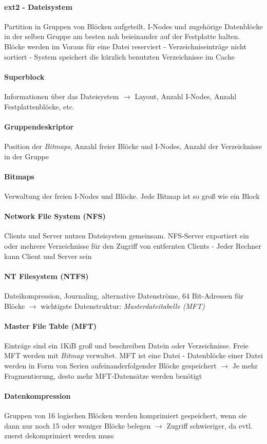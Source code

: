 \documentclass[11pt,a4paper,landscape]{article}
\begin{document}
\begin{multicols*}{3}
	\paragraph{ext2 - Dateisystem} Partition in Gruppen von Blöcken aufgeteilt. I-Nodes und zugehörige Datenblöcke in der selben Gruppe am besten nah beieinander auf der Festplatte halten. Blöcke werden im Voraus für eine Datei reserviert - Verzeichniseinträge nicht sortiert - System speichert die kürzlich benutzten Verzeichnisse im Cache
	\paragraph{Superblock} Informationen über das Dateisystem $\rightarrow$ Layout, Anzahl I-Nodes, Anzahl Festplattenblöcke, etc.
	\paragraph{Gruppendeskriptor} Position der \textit{Bitmaps}, Anzahl freier Blöcke und I-Nodes, Anzahl der Verzeichnisse in der Gruppe
	\paragraph{Bitmaps} Verwaltung der freien I-Nodes und Blöcke. Jede Bitmap ist so groß wie ein Block
	\paragraph{Network File System (NFS)} Clients und Server nutzen Dateisystem gemeinsam. NFS-Server exportiert ein oder mehrere Verzeichnisse für den Zugriff von entfernten Clients - Jeder Rechner kann Client und Server sein
	\paragraph{NT Filesystem (NTFS)} Dateikompression, Journaling, alternative Datenströme, 64 Bit-Adressen für Blöcke $\rightarrow$ wichtigste Datenstruktur: \textit{Masterdateitabelle (MFT)} 
	\paragraph{Master File Table (MFT)} Einträge sind ein 1KiB groß und beschreiben Datein oder Verzeichnisse. Freie MFT werden mit \textit{Bitmap} verwaltet. MFT ist eine Datei - Datenblöcke einer Datei werden in Form von Serien aufeinanderfolgender Blöcke gespeichert $\rightarrow$ Je mehr Fragmentierung, desto mehr MFT-Datensätze werden benötigt
	\paragraph{Datenkompression} Gruppen von 16 logischen Blöcken werden komprimiert gespeichert, wenn sie dann nur noch 15 oder weniger Blöcke belegen $\rightarrow$ Zugriff schwieriger, da evtl. zuerst dekomprimiert werden muss

\end{multicols*}
\end{document}
